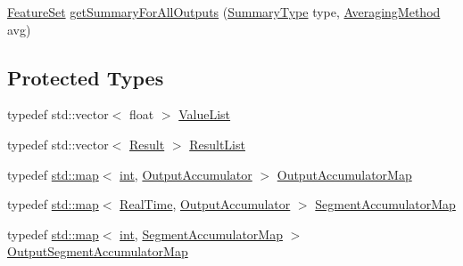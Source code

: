 \begin{DoxyCompactItemize}
\item 
\hyperlink{class_vamp_1_1_plugin_a448fb57dc245d47923ec9eeaf9856c5f}{Feature\+Set} \hyperlink{class_vamp_1_1_host_ext_1_1_plugin_summarising_adapter_1_1_impl_ad523e94d8c7ec2888be8666ae2d464ca}{get\+Summary\+For\+All\+Outputs} (\hyperlink{class_vamp_1_1_host_ext_1_1_plugin_summarising_adapter_af504f810448961fc489e9b6572471705}{Summary\+Type} type, \hyperlink{class_vamp_1_1_host_ext_1_1_plugin_summarising_adapter_a294e9eed9c541dcedbaa4f2dfda1ac76}{Averaging\+Method} avg)
\end{DoxyCompactItemize}
\subsection*{Protected Types}
\begin{DoxyCompactItemize}
\item 
typedef std\+::vector$<$ float $>$ \hyperlink{class_vamp_1_1_host_ext_1_1_plugin_summarising_adapter_1_1_impl_a1b882efc9db48427875cb1274478e91d}{Value\+List}
\item 
typedef std\+::vector$<$ \hyperlink{struct_vamp_1_1_host_ext_1_1_plugin_summarising_adapter_1_1_impl_1_1_result}{Result} $>$ \hyperlink{class_vamp_1_1_host_ext_1_1_plugin_summarising_adapter_1_1_impl_ac42707318aa1472c3c88d573a23ba6b2}{Result\+List}
\item 
typedef \hyperlink{xllist_8c_a03a3bd19ed9a28af3660a6c7b77249c2}{std\+::map}$<$ \hyperlink{xmltok_8h_a5a0d4a5641ce434f1d23533f2b2e6653}{int}, \hyperlink{struct_vamp_1_1_host_ext_1_1_plugin_summarising_adapter_1_1_impl_1_1_output_accumulator}{Output\+Accumulator} $>$ \hyperlink{class_vamp_1_1_host_ext_1_1_plugin_summarising_adapter_1_1_impl_a9f0659491f7b4894576b6bb8448df68d}{Output\+Accumulator\+Map}
\item 
typedef \hyperlink{xllist_8c_a03a3bd19ed9a28af3660a6c7b77249c2}{std\+::map}$<$ \hyperlink{struct_vamp_1_1_real_time}{Real\+Time}, \hyperlink{struct_vamp_1_1_host_ext_1_1_plugin_summarising_adapter_1_1_impl_1_1_output_accumulator}{Output\+Accumulator} $>$ \hyperlink{class_vamp_1_1_host_ext_1_1_plugin_summarising_adapter_1_1_impl_a49b782f5fabb302640daece89cad6a1e}{Segment\+Accumulator\+Map}
\item 
typedef \hyperlink{xllist_8c_a03a3bd19ed9a28af3660a6c7b77249c2}{std\+::map}$<$ \hyperlink{xmltok_8h_a5a0d4a5641ce434f1d23533f2b2e6653}{int}, \hyperlink{class_vamp_1_1_host_ext_1_1_plugin_summarising_adapter_1_1_impl_a49b782f5fabb302640daece89cad6a1e}{Segment\+Accumulator\+Map} $>$ \hyperlink{class_vamp_1_1_host_ext_1_1_plugin_summarising_adapter_1_1_impl_a6b12d5110338dc49aadebec6a9df6cb9}{Output\+Segment\+Accumulator\+Map}

\end{DoxyCompactItemize}
